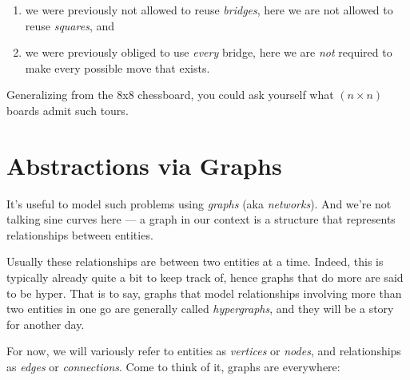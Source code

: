 \documentclass[
  letterpaper,
  DIV=11,
  numbers=noendperiod]{scrreprt}
\providecommand{\tightlist}{%
  \setlength{\itemsep}{0pt}\setlength{\parskip}{0pt}}\usepackage{longtable,booktabs,array}
\begin{document}
\begin{enumerate}
\def\labelenumi{\arabic{enumi}.}
\tightlist
\item
  we were previously not allowed to reuse \emph{bridges}, here we are
  not allowed to reuse \emph{squares}, and
\item
  we were previously obliged to use \emph{every} bridge, here we are
  \emph{not} required to make every possible move that exists.
\end{enumerate}

Generalizing from the 8x8 chessboard, you could ask yourself what
\((n \times n)\) boards admit such tours.

\begin{tcolorbox}[standard jigsaw,toptitle=1mm, titlerule=0mm, bottomtitle=1mm, title=\textcolor{quarto-callout-warning-color}{\faExclamationTriangle}\hspace{0.5em}{(Spoiler) Numberphile commentary on the knight's tour}, coltitle=black, colback=white, toprule=.15mm, colframe=quarto-callout-warning-color-frame, arc=.35mm, rightrule=.15mm, opacityback=0, left=2mm, leftrule=.75mm, colbacktitle=quarto-callout-warning-color!10!white, opacitybacktitle=0.6, bottomrule=.15mm]

\end{tcolorbox}

\hypertarget{abstractions-via-graphs}{%
\section{Abstractions via Graphs}\label{abstractions-via-graphs}}

It's useful to model such problems using \emph{graphs} (aka
\emph{networks}). And we're not talking sine curves here --- a graph in
our context is a structure that represents relationships between
entities.

Usually these relationships are between two entities at a time. Indeed,
this is typically already quite a bit to keep track of, hence graphs
that do more are said to be hyper. That is to say, graphs that model
relationships involving more than two entities in one go are generally
called \emph{hypergraphs}, and they will be a story for another day.

For now, we will variously refer to entities as \emph{vertices} or
\emph{nodes}, and relationships as \emph{edges} or \emph{connections}.
Come to think of it, graphs are everywhere:
\end{document}
